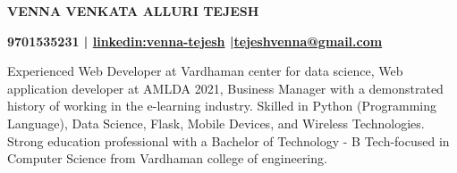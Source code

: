 \documentclass[a4paper]{article}
\begin{document}
 

\begin{center}
\begin{Large}

\textbf{VENNA VENKATA ALLURI TEJESH}\\


\end{Large}
\textbf{9701535231 | \href{https://www.linkedin.com/in/venna-tejesh/}{linkedin:venna-tejesh} |\href{tejeshvenna@gmail.com}{tejeshvenna@gmail.com}}
\end{center}



\begin{normalsize}
\noindent Experienced Web Developer at Vardhaman center for data science, Web application
developer at AMLDA 2021, Business Manager with a demonstrated history of working in
the e-learning industry. Skilled in Python (Programming Language), Data Science,
Flask, Mobile Devices, and Wireless Technologies. Strong education professional with a
Bachelor of Technology - B Tech-focused in Computer Science from Vardhaman
college of engineering.
\vspace{0.9pt}
\end{normalsize}
\end{document}
